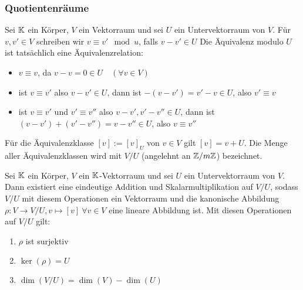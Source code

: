 \subsubsection{Quotientenräume}
Sei $ \mathbb K $ ein Körper, $ V $ ein Vektorraum und sei $ U $ ein Untervektorraum von $ V $. Für $ v,v' \in V $ schreiben wir $ v \equiv v' \mod{u} $, falls $ v - v' \in U $ Die Äquivalenz modulo $ U $ ist tatsächlich eine Äquivalenzrelation:
\begin{itemize}
	\item	$ v \equiv v $, da $ v-v = 0 \in U \quad (\forall v \in V) $
	\item ist $ v \equiv v' $ also $ v-v' \in U $, dann ist $ -(v-v') = v'-v \in U $, also $ v' \equiv v $
	\item ist $ v \equiv v' $ und $ v' \equiv v'' $ also $ v - v', v' - v'' \in U$, dann ist $ (v - v') + (v' - v'') = v-v'' \in U $, also $ v \equiv v'' $
\end{itemize}
Für die Äquivalenzklasse $ [v] := [v]_U $ von $ v \in V $ gilt $ [v] = v + U $.
Die Menge aller Äquivalenzklassen wird mit $ V/U $ (angelehnt an $ \mathbb Z/m\mathbb Z $) bezeichnet.
\begin{thm}
	Sei $ \mathbb K $ ein Körper, $ V $ ein $ \mathbb K $-Vektorraum und sei $ U $ ein Untervektorraum von $ V $. Dann existiert eine eindeutige Addition und Skalarmultiplikation auf $ V/U $, sodass $ V/U $ mit diesem Operationen ein Vektorraum und die kanonische Abbildung $ \rho : V \rightarrow V/U, v \mapsto [v] \: \forall v \in V $ eine lineare Abbildung ist. Mit diesen Operationen auf $ V/U $ gilt:
	\begin{enumerate}[label=\normalfont(\alph*)]
		\item $ \rho $ ist surjektiv
		\item $ \ker(\rho) = U $
		\item $ \dim(V/U) = \dim(V) - \dim(U) $
	\end{enumerate}
\end{thm}
